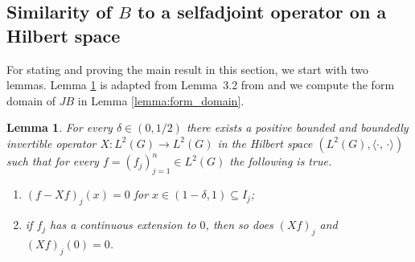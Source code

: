 \documentclass{article}
\numberwithin{equation}{section}
\newtheorem{lemma}[theorem]{Lemma}
\theoremstyle{definition}
\newcommand{\scalar}[2]{\langle#1,\, #2\rangle}
\newcommand{\AKone}{B}
\begin{document}
\subsection{Similarity of \texorpdfstring{$\AKone$}{B} to a selfadjoint operator on a Hilbert space}
\label{subsection:similarity}

	For stating and proving the main result in this section, we start with two lemmas. Lemma \ref{lemma:invertible_operator} is adapted from Lemma~3.2 from \cite{CurgusLanger1989} and we compute the form domain of $JB$ in Lemma \ref{lemma:form_domain}.

\begin{lemma}
\label{lemma:invertible_operator}
   For every $\delta\in (0, 1/2)$ there exists a positive bounded and boundedly invertible operator $X: L^2(G)\to L^2(G)$ in the Hilbert space $(L^2(G),\scalar{\cdot}{\cdot})$ such that
   for every $f = (f_j)_{j=1}^n\in L^2(G)$ the following is true.
   \begin{enumerate}[label={(\roman*)}]
	\item\label{item:Xi} 
    $(f-Xf)_j(x) = 0$ for $x \in(1-\delta, 1)\subseteq I_j$;
    
	\item\label{item:Xii} 
        if $f_j$ has a continuous extension to $0$, then so does $(Xf)_j$ and $(Xf)_j(0) = 0$.
   \end{enumerate}
\end{lemma}
\end{document}

